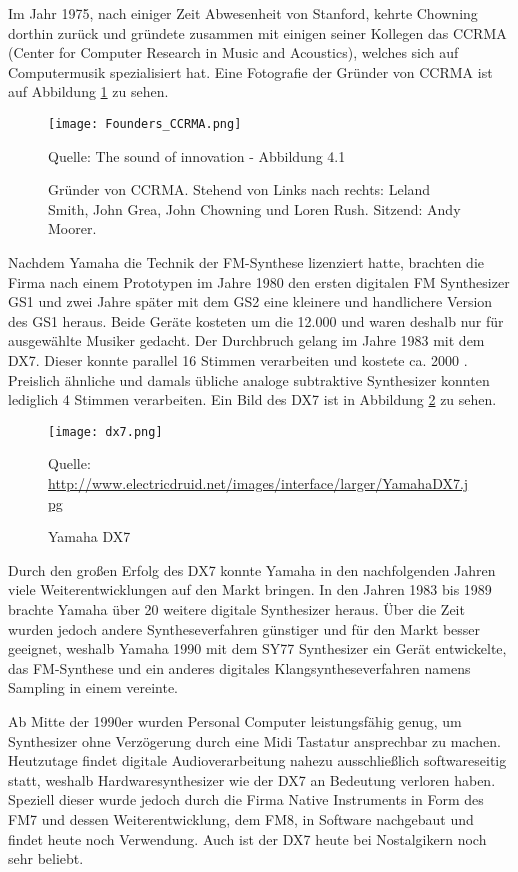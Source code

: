 Im Jahr 1975, nach einiger Zeit Abwesenheit von Stanford, kehrte Chowning dorthin zurück und gründete zusammen mit einigen seiner Kollegen das CCRMA (Center for Computer Research in Music and Acoustics), welches sich auf Computermusik spezialisiert hat.
Eine Fotografie der Gründer von CCRMA ist auf Abbildung \ref{fig:foundersCCRMA} zu sehen.

\begin{figure} [ht]
\centering
  \texttt{[image: Founders\_CCRMA.png]}
\caption{Gründer von CCRMA. Stehend von Links nach rechts: Leland Smith, John Grea, John Chowning und Loren Rush. Sitzend: Andy Moorer.}
\label{fig:foundersCCRMA}
Quelle: The sound of innovation - Abbildung 4.1
\end{figure}

Nachdem Yamaha die Technik der FM-Synthese lizenziert hatte, brachten die Firma nach einem Prototypen im Jahre 1980 den ersten digitalen FM Synthesizer GS1 und zwei Jahre später mit dem GS2 eine kleinere und handlichere Version des GS1 heraus. Beide Geräte kosteten um die 12.000 \textdollar und waren deshalb nur für ausgewählte Musiker gedacht. Der Durchbruch gelang im Jahre 1983 mit dem DX7. Dieser konnte parallel 16 Stimmen verarbeiten und kostete ca. 2000 \textdollar. Preislich ähnliche und damals übliche analoge subtraktive Synthesizer konnten lediglich 4 Stimmen verarbeiten. Ein Bild des DX7 ist in Abbildung \ref{fig:dx7} zu sehen.

 \begin{figure} [ht]
\centering
  \texttt{[image: dx7.png]}
\caption{Yamaha DX7}
\label{fig:dx7}
Quelle: \url{http://www.electricdruid.net/images/interface/larger/YamahaDX7.jpg}
\end{figure}

Durch den großen Erfolg des DX7 konnte Yamaha in den nachfolgenden Jahren viele Weiterentwicklungen auf den Markt bringen. In den Jahren 1983 bis 1989 brachte Yamaha über 20 weitere digitale Synthesizer heraus. Über die Zeit wurden jedoch andere Syntheseverfahren günstiger und für den Markt besser geeignet, weshalb Yamaha 1990 mit dem SY77 Synthesizer ein Gerät entwickelte, das FM-Synthese und ein anderes digitales Klangsyntheseverfahren namens Sampling in einem vereinte. 

Ab Mitte der 1990er wurden Personal Computer leistungsfähig genug, um Synthesizer ohne Verzögerung durch eine Midi Tastatur ansprechbar zu machen. Heutzutage findet digitale Audioverarbeitung nahezu ausschließlich softwareseitig statt, weshalb Hardwaresynthesizer wie der DX7 an Bedeutung verloren haben. Speziell dieser wurde jedoch durch die Firma Native Instruments in Form des FM7 und dessen Weiterentwicklung, dem FM8, in Software nachgebaut und findet heute noch Verwendung. Auch ist der DX7 heute bei Nostalgikern noch sehr beliebt.
